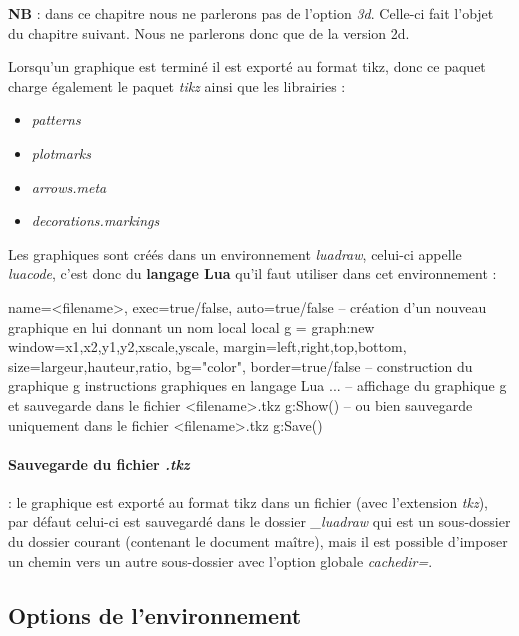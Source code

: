 \noindent\textbf{NB} : dans ce chapitre nous ne parlerons pas de l'option \emph{3d}. Celle-ci fait l'objet du chapitre suivant. Nous ne parlerons donc que de la version 2d.

Lorsqu'un graphique est terminé il est exporté au format tikz, donc ce paquet charge également le paquet \emph{tikz} ainsi que les librairies :
\begin{itemize}
\item\emph{patterns}
\item\emph{plotmarks}
\item\emph{arrows.meta}
\item\emph{decorations.markings}
\end{itemize}

Les graphiques sont créés dans un environnement \emph{luadraw}, celui-ci appelle \emph{luacode}, c'est donc du \textbf{langage Lua} qu'il faut utiliser dans cet environnement :

\begin{TeXcode}
\begin{luadraw}{ name=<filename>, exec=true/false, auto=true/false }
-- création d'un nouveau graphique en lui donnant un nom local
local g = graph:new{ window={x1,x2,y1,y2,xscale,yscale}, margin={left,right,top,bottom},
                     size={largeur,hauteur,ratio}, bg="color", border=true/false }
-- construction du graphique g
    instructions graphiques en langage Lua ...
-- affichage du graphique g et sauvegarde dans le fichier <filename>.tkz
g:Show()
-- ou bien sauvegarde uniquement dans le fichier <filename>.tkz
g:Save()
\end{luadraw}
\end{TeXcode}

\paragraph{Sauvegarde du fichier \emph{.tkz}} : le graphique est exporté au format tikz dans un fichier (avec l'extension \emph{tkz}), par défaut celui-ci est sauvegardé dans le dossier \emph{\_luadraw} qui est un sous-dossier du dossier courant (contenant le document maître), mais il est possible d'imposer un chemin vers un autre sous-dossier avec l'option globale \emph{cachedir=}.

\subsection{Options de l'environnement}

